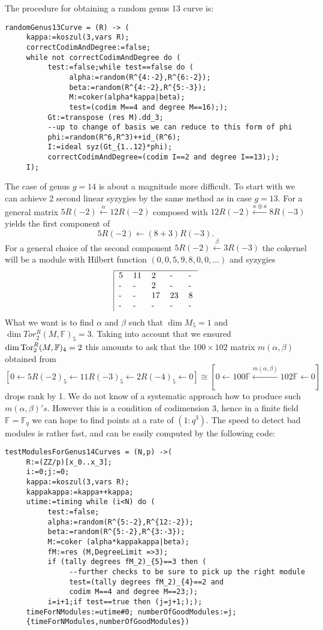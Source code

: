\documentclass[12pt,leqno]{amsart}
\newcommand{\FF}{{\mathbb F}}
\newcommand{\Tor}{{\rm{Tor}}}
\newcommand{\lto}{\leftarrow}
\newlength{\ho}
\begin{document}
\noindent
The procedure for obtaining a random genus 13 curve is:
{\scriptsize
\begin{verbatim} 
randomGenus13Curve = (R) -> (
     kappa:=koszul(3,vars R);
     correctCodimAndDegree:=false;
     while not correctCodimAndDegree do (
          test:=false;while test==false do ( 
               alpha:=random(R^{4:-2},R^{6:-2});
               beta:=random(R^{4:-2},R^{5:-3});
               M:=coker(alpha*kappa|beta);
               test=(codim M==4 and degree M==16););
          Gt:=transpose (res M).dd_3;
          --up to change of basis we can reduce to this form of phi
          phi:=random(R^6,R^3)++id_(R^6);
          I:=ideal syz(Gt_{1..12}*phi);
          correctCodimAndDegree=(codim I==2 and degree I==13););
     I);
\end{verbatim}}


\medskip
The case of genus $g=14$ is about a magnitude more difficult. 
To start with we can achieve 2 second linear syzygies by the same method as 
in case $g=13$. 
For a general matrix 
$5R(-2) \stackrel{\alpha}{\lto} 12R(-2)$ composed with 
$12R(-2) \stackrel{\kappa \oplus \kappa}{\lto} 8R(-3)$ 
yields the first component of
$$5R(-2) \lto (8+3)R(-3).$$
For a general choice of the second component 
$5R(-2) \stackrel{\beta}{ \lto} 3R(-3)$ the cokernel
will be a module with Hilbert function $(0,0,5,9,8,0,0,\ldots)$ and syzygies
$$
\begin{tabular}{|lllll}\hline
5 & 11 & 2 & - & -  \cr
- & - & 2 & - & - \cr
- & - & 17 & 23 & 8  \cr
- & - & - & - & - \cr
\end{tabular}
$$
What we want is to find $\alpha$ and $\beta$ such that $\dim M_5 = 1$ 
and $\dim Tor_2^R(M,\FF)_5 = 3$.
Taking into account that we ensured $\dim \Tor_2^R(M,\FF)_4 =2$
this amounts to ask that the $100 \times 102$ matrix $m(\alpha,\beta)$ 
obtained from
$$[0 \lto 5R(-2)_5 \lto 11R(-3)_5 \lto 2R(-4)_5 \lto 0] 
\cong [0 \lto 100 \FF \stackrel{m(\alpha,\beta)} \lto 102 \FF \lto 0]$$
drops rank by 1. 
We do not know of a systematic approach how to produce such 
$m(\alpha,\beta)'s$.
However this is a condition of codimension 3, hence in a finite field 
$\FF=\FF_q$ we can hope to find points at a rate of $(1:q^3)$. 
The speed to detect bad modules is rather fast, 
and can be easily computed by the following code:
{\scriptsize
\begin{verbatim} 
testModulesForGenus14Curves = (N,p) ->(
     R:=(ZZ/p)[x_0..x_3];
     i:=0;j:=0;
     kappa:=koszul(3,vars R);
     kappakappa:=kappa++kappa;
     utime:=timing while (i<N) do (
          test:=false;
          alpha:=random(R^{5:-2},R^{12:-2});
          beta:=random(R^{5:-2},R^{3:-3});
          M:=coker (alpha*kappakappa|beta);
          fM:=res (M,DegreeLimit =>3);
          if (tally degrees fM_2)_{5}==3 then (
               --further checks to be sure to pick up the right module
               test=(tally degrees fM_2)_{4}==2 and
               codim M==4 and degree M==23;);
          i=i+1;if test==true then (j=j+1;););
     timeForNModules:=utime#0; numberOfGoodModules:=j;
     {timeForNModules,numberOfGoodModules})     
\end{verbatim}}
\end{document}
